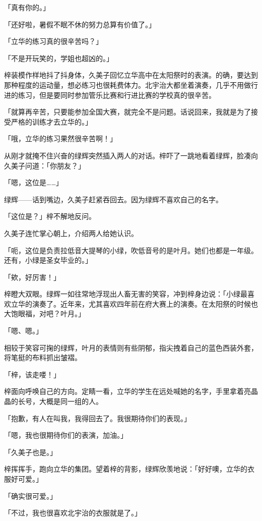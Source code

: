\documentclass[UTF8]{ctexart}
\begin{document}
    「真有你的。」 

    「还好啦，暑假不眠不休的努力总算有价值了。」 

    「立华的练习真的很辛苦吗？」 

    「不是开玩笑的，学姐也超凶的。」 

    梓装模作样地抖了抖身体，久美子回忆立华高中在太阳祭时的表演。的确，要达到那种程度的运动量，想必练习也很耗费体力。北宇治大都坐着演奏，几乎不用做行进的练习，但是要同时参加管乐比赛和行进比赛的学校真的很辛苦。 

    「就算再辛苦，只要能参加全国大赛，就完全不是问题。话说回来，我就是为了接受严格的训练才去立华的。」 

    「哦，立华的练习果然很辛苦啊！」 

    从刚才就掩不住兴奋的绿辉突然插入两人的对话。梓吓了一跳地看着绿辉，脸凑向久美子问道：「你朋友？」 

    「嗯，这位是……」 

    绿辉——话到嘴边，久美子赶紧吞回去。因为绿辉不喜欢自己的名字。 

    「这位是？」梓不解地反问。 

    久美子连忙掌心朝上，介绍两人给她认识。 

    「呃，这位是负责拉低音大提琴的小绿，吹低音号的是叶月。她们也都是一年级。还有，小绿是圣女毕业的。」 

    「欸，好厉害！」 

    梓瞪大双眼。绿辉一如往常地浮现出人畜无害的笑容，冲到梓身边说：「小绿最喜欢立华的演奏了。近年来，尤其喜欢四年前在府大赛上的演奏。在太阳祭的时候也大饱眼福，对吧？叶月。」 

    「嗯、嗯。」 

    相较于笑容可掬的绿辉，叶月的表情则有些阴郁，指尖拽着自己的蓝色西装外套，将笔挺的布料抓出皱褶。 

    「梓，该走喽！」 

    梓面向呼唤自己的方向。定睛一看，立华的学生在远处喊她的名字，手里拿着亮晶晶的长号，大概是同一组的人。 

    「抱歉，有人在叫我，我得回去了。我很期待你们的表现。」 

    「嗯，我也很期待你们的表演，加油。」 

    「久美子也是。」 

    梓挥挥手，跑向立华的集团。望着梓的背影，绿辉欣羡地说：「好好噢，立华的衣服好可爱。」 

    「确实很可爱。」 

    「不过，我也很喜欢北宇治的衣服就是了。」 
\end{document}
